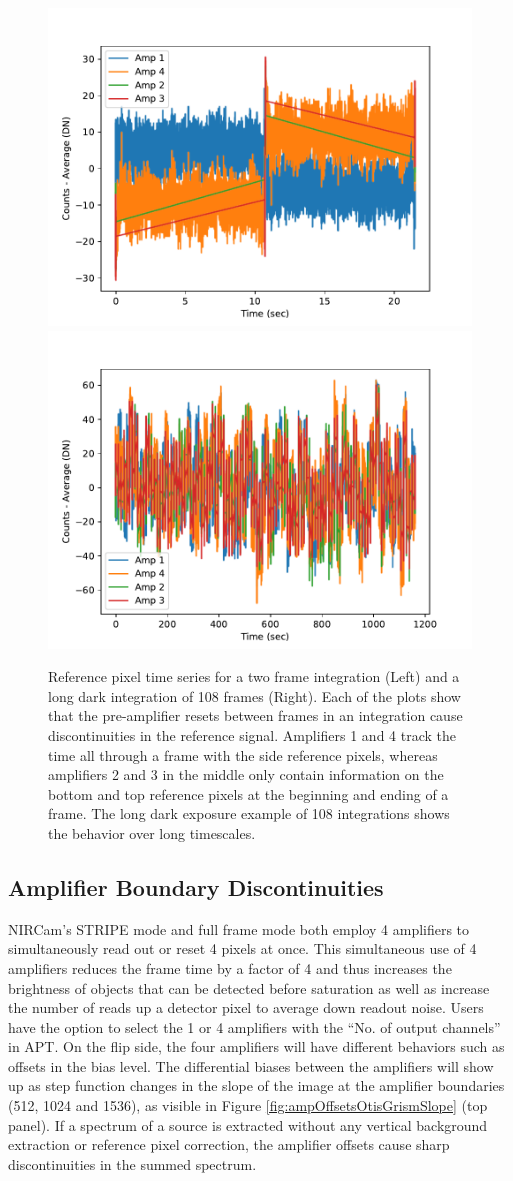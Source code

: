 \documentclass[]{aastex62}
\begin{document}
\begin{figure}[!hbtp]
\centering
\includegraphics[width=.49\columnwidth]{allamps.pdf}
\includegraphics[width=.49\columnwidth]{allamps_long_dark.pdf}
\caption{Reference pixel time series for a two frame integration (Left) and a long dark integration of 108 frames (Right). Each of the plots show that the pre-amplifier resets between frames in an integration cause discontinuities in the reference signal. Amplifiers 1 and 4 track the time all through a frame with the side reference pixels, whereas amplifiers 2 and 3 in the middle only contain information on the bottom and top reference pixels at the beginning and ending of a frame.
The long dark exposure example of 108 integrations shows the behavior over long timescales.}\label{fig:ampResetDark}
\end{figure}

\subsection{Amplifier Boundary Discontinuities}

NIRCam's STRIPE mode and full frame mode both employ 4 amplifiers to simultaneously read out or reset 4 pixels at once.
This simultaneous use of 4 amplifiers reduces the frame time by a factor of 4 and thus increases the brightness of objects that can be detected before saturation as well as increase the number of reads up a detector pixel to average down readout noise.
Users have the option to select the 1 or 4 amplifiers with the ``No. of output channels'' in APT.
On the flip side, the four amplifiers will have different behaviors such as offsets in the bias level.
The differential biases between the amplifiers will show up as step function changes in the slope of the image at the amplifier boundaries (512, 1024 and 1536), as visible in Figure \ref{fig:ampOffsetsOtisGrismSlope} (top panel).
If a spectrum of a source is extracted without any vertical background extraction or reference pixel correction, the amplifier offsets cause sharp discontinuities in the summed spectrum.
\end{document}
